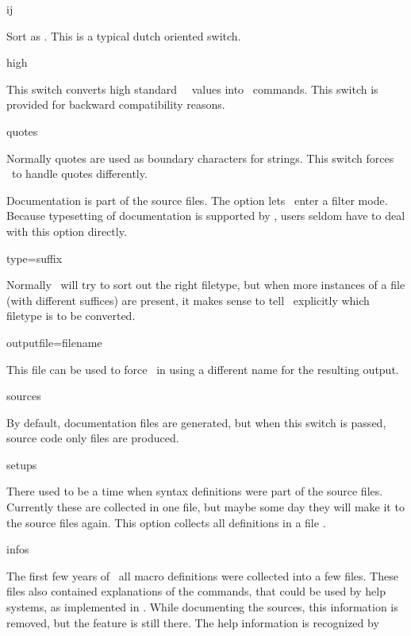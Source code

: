 {{{{\switch ij 

Sort  as . This is a typical dutch oriented switch. 

\switch high 

This switch converts high standard \MSDOS\ \ASCII\ values into \TEX\
commands. This switch is provided for backward compatibility reasons. 

\switch quotes 

Normally quotes are used as boundary characters for strings. This switch
forces \TEXUTIL\ to handle quotes differently. 

\subject {Documents}   

Documentation is part of the source files. The  option
lets \TEXUTIL\ enter a filter mode. Because typesetting of documentation is
supported by \TEXEXEC, users seldom have to deal with this option directly. 

\switch type=suffix   

Normally \TEXUTIL\ will try to sort out the right filetype, but when more
instances of a file (with different suffices) are present, it makes sense to
tell \TEXUTIL\ explicitly which filetype is to be converted. 

\switch outputfile=filename

This file can be used to force \TEXUTIL\ in using a different name for the
resulting output. 

\switch sources 

By default, documentation files are generated, but when this switch is
passed, source code only files are produced. 

\switch setups   

There used to be a time when syntax definitions were part of the source
files. Currently these are collected in one file, but maybe some day they
will make it to the source files again. This option collects all definitions
in a file \type {texutil.tus}. 

\switch infos   

The first few years of \CONTEXT\ all macro definitions were collected into a
few files. These files also contained explanations of the commands, that
could be used by help systems, as implemented in \TEXEDIT. While documenting
the sources, this information is removed, but the feature is still there. The
help information is recognized by \type {%
files with the suffix \type {tud}. 

\switch templates 

}}}}}
